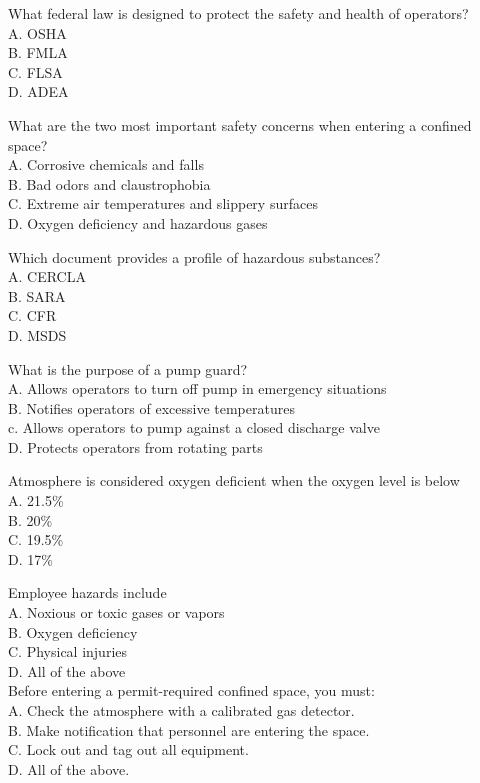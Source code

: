 What federal law is designed to protect the safety and health of operators?\\
A.	OSHA\\
B.	FMLA\\
C.	FLSA\\
D.	ADEA

What are the two most important safety concerns when entering a confined space?\\
A.	Corrosive chemicals and falls\\
B.	Bad odors and claustrophobia\\
C.	Extreme air temperatures and slippery surfaces\\
D.	Oxygen deficiency and hazardous gases

Which document provides a profile of hazardous substances?\\
A.	CERCLA\\
B.	SARA\\
C.	CFR\\
D.	MSDS

What is the purpose of a pump guard?\\
A.	Allows operators to turn off pump in emergency situations\\
B.	Notifies operators of excessive temperatures\\
c.	Allows operators to pump against a closed discharge valve\\
D.	Protects operators from rotating parts

Atmosphere is considered oxygen deficient when the oxygen level is below\\
A.	21.5\%\\
B.	20\%\\
C.	19.5\%\\
D.  17\%


Employee hazards include\\
A. Noxious or toxic gases or vapors\\
B. Oxygen deficiency\\
C. Physical injuries\\
D. All of the above\\

Before entering a permit-required confined space, you must:\\
A. Check the atmosphere with a calibrated gas detector.\\
B. Make notification that personnel are entering the space.\\
C. Lock out and tag out all equipment.\\
D. All of the above.
	 
